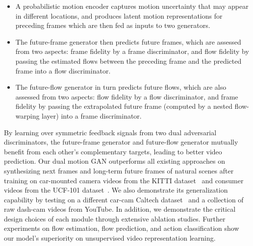 \documentclass[10pt,twocolumn,letterpaper]{article}
\newcommand{\lisa}[1]{{\color{blue}#1}}
\begin{document}
	
	
	\begin{itemize}
		\vspace{-3mm}
		\item A probabilistic motion encoder captures motion uncertainty that may appear in different locations, and produces latent motion representations for preceding frames which are then fed as inputs to two generators.
		\vspace{-2mm}
		\item The future-frame generator then predicts future frames, which are assessed from two aspects: frame fidelity by a frame discriminator, and flow fidelity by passing the estimated flows between the preceding frame and the predicted frame into a flow discriminator.
		\vspace{-2mm}
		\item The future-flow generator in turn predicts future flows, which are also assessed from two aspects: flow fidelity by a flow discriminator, and frame fidelity by passing the extrapolated future frame (computed by a nested flow-warping layer) into a frame discriminator. 
		\vspace{-2mm}
	\end{itemize}
	
	
	By learning over symmetric feedback signals from two dual adversarial discriminators, the future-frame generator and future-flow generator mutually benefit from each other's complementary targets, leading to better video prediction. %
	Our dual motion GAN outperforms all existing approaches on synthesizing next frames and long-term future frames of natural scenes after training on car-mounted camera videos from the KITTI dataset~\cite{geiger2013vision} and consumer videos from the UCF-101 dataset~\cite{soomro2012ucf101}. We also demonstrate its generalization capability by testing on a different car-cam Caltech dataset~\cite{dollar2009pedestrian} and a collection of raw dash-cam videos from YouTube. In addition, we demonstrate the critical design choices of each module through extensive ablation studies. Further experiments on flow estimation, flow prediction, and action classification show our model's superiority on unsupervised video representation learning.
\end{document}
